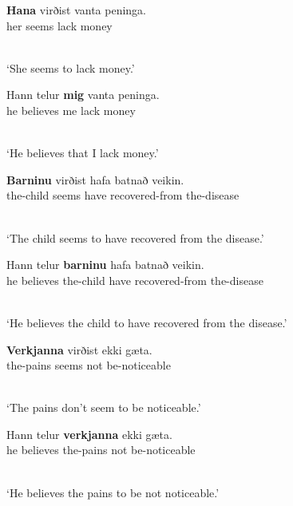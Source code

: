 \documentclass[output=paper]{langsci/langscibook}
\begin{document}
\begin{examples}
\item \label{isl:acc}
  \begin{examples}
  \item 
    \begin{gloss}
      \textbf{Hana} virðist vanta peninga. \\
      her\Acc{} seems lack\Inf{} money
    \end{gloss}\\[\glosslen]
    `She seems to lack money.'
  \item 
    \begin{gloss}
      Hann telur \textbf{mig} vanta peninga. \\
      he\Nom{} believes me\Acc{} lack\Inf{} money
    \end{gloss}\\[\glosslen]
    `He believes that I lack money.'
  \end{examples}
\item \label{isl:dat}
  \begin{examples}
  \item
    \begin{gloss}
      \textbf{Barninu} virðist hafa batnað veikin. \\
      the-child\Dat{} seems have\Inf{} recovered-from the-disease
    \end{gloss}\\[\glosslen]
    `The child seems to have recovered from the disease.'
  \item 
    \begin{gloss}
      Hann telur \textbf{barninu} hafa batnað veikin. \\
      he believes the-child\Dat{} have\Inf{} recovered-from the-disease
    \end{gloss}\\[\glosslen]
    `He believes the child to have recovered from the disease.'
  \end{examples}
\item \label{isl:gen}
  \begin{examples}
  \item
    \begin{gloss}
      \textbf{Verkjanna} virðist ekki g\ae{}ta. \\
      the-pains\Gen{} seems not be-noticeable\Inf{}
    \end{gloss}\\[\glosslen]
    `The pains don't seem to be noticeable.'
  \item 
    \begin{gloss}
      Hann telur \textbf{verkjanna} ekki g\ae{}ta. \\
      he believes the-pains\Gen{} not be-noticeable\Inf{}
    \end{gloss}\\[\glosslen]
    `He believes the pains to be not noticeable.'
  \end{examples}
\end{examples}
\end{document}

